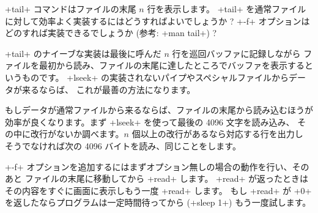 \begin{exercise}
\ml+tail+ コマンドはファイルの末尾 $n$ 行を表示します。
\ml+tail+ を通常ファイルに対して効率よく実装するにはどうすればよいでしょうか ?
\ml+-f+ オプションはどのすれば実装できるでしょうか (参考: \ml+man tail+) ?
\enlargethispage{3\baselineskip} %
\end{exercise}
\begin{answer}
\ml+tail+ のナイーブな実装は最後に呼んだ $n$ 行を巡回バッファに記録しながら
ファイルを最初から読み、ファイルの末尾に達したところでバッファを表示するというものです。
\ml+lseek+ の実装されないパイプやスペシャルファイルからデータが来るならば、
これが最善の方法になります。

もしデータが通常ファイルから来るならば、ファイルの末尾から読み込むほうが
効率が良くなります。まず \ml+lseek+ を使って最後の 4096 文字を読み込み、
その中に改行がないか調べます。$n$ 個以上の改行があるなら対応する行を出力し
そうでなければ次の 4096 バイトを読み、同じことをします。

\ml+-f+ オプションを追加するにはまずオプション無しの場合の動作を行い、そのあと
ファイルの末尾に移動してから \ml+read+ します。
\ml+read+ が返ったときはその内容をすぐに画面に表示しもう一度 \ml+read+ します。
もし \ml+read+ が \ml+0+ を返したならプログラムは一定時間待ってから (\ml+sleep 1+) もう一度試します。
\end{answer}


